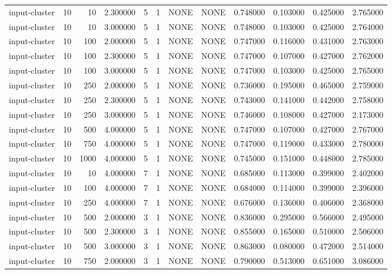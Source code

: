 \begin{tabular}{lrrrllllrrrr}
input-cluster & 10 & 10 & 2.300000 & 5 & 1 & NONE & NONE & 0.748000 & 0.103000 & 0.425000 & 2.765000 \\
input-cluster & 10 & 10 & 3.000000 & 5 & 1 & NONE & NONE & 0.748000 & 0.103000 & 0.425000 & 2.764000 \\
input-cluster & 10 & 100 & 2.000000 & 5 & 1 & NONE & NONE & 0.747000 & 0.116000 & 0.431000 & 2.763000 \\
input-cluster & 10 & 100 & 2.300000 & 5 & 1 & NONE & NONE & 0.747000 & 0.107000 & 0.427000 & 2.762000 \\
input-cluster & 10 & 100 & 3.000000 & 5 & 1 & NONE & NONE & 0.747000 & 0.103000 & 0.425000 & 2.765000 \\
input-cluster & 10 & 250 & 2.000000 & 5 & 1 & NONE & NONE & 0.736000 & 0.195000 & 0.465000 & 2.759000 \\
input-cluster & 10 & 250 & 2.300000 & 5 & 1 & NONE & NONE & 0.743000 & 0.141000 & 0.442000 & 2.758000 \\
input-cluster & 10 & 250 & 3.000000 & 5 & 1 & NONE & NONE & 0.746000 & 0.108000 & 0.427000 & 2.173000 \\
input-cluster & 10 & 500 & 4.000000 & 5 & 1 & NONE & NONE & 0.747000 & 0.107000 & 0.427000 & 2.767000 \\
input-cluster & 10 & 750 & 4.000000 & 5 & 1 & NONE & NONE & 0.747000 & 0.119000 & 0.433000 & 2.780000 \\
input-cluster & 10 & 1000 & 4.000000 & 5 & 1 & NONE & NONE & 0.745000 & 0.151000 & 0.448000 & 2.785000 \\
input-cluster & 10 & 10 & 4.000000 & 7 & 1 & NONE & NONE & 0.685000 & 0.113000 & 0.399000 & 2.402000 \\
input-cluster & 10 & 100 & 4.000000 & 7 & 1 & NONE & NONE & 0.684000 & 0.114000 & 0.399000 & 2.396000 \\
input-cluster & 10 & 250 & 4.000000 & 7 & 1 & NONE & NONE & 0.676000 & 0.136000 & 0.406000 & 2.368000 \\
input-cluster & 10 & 500 & 2.000000 & 3 & 1 & NONE & NONE & 0.836000 & 0.295000 & 0.566000 & 2.495000 \\
input-cluster & 10 & 500 & 2.300000 & 3 & 1 & NONE & NONE & 0.855000 & 0.165000 & 0.510000 & 2.506000 \\
input-cluster & 10 & 500 & 3.000000 & 3 & 1 & NONE & NONE & 0.863000 & 0.080000 & 0.472000 & 2.514000 \\
input-cluster & 10 & 750 & 2.000000 & 3 & 1 & NONE & NONE & 0.790000 & 0.513000 & 0.651000 & 3.086000 \\

\end{tabular}

